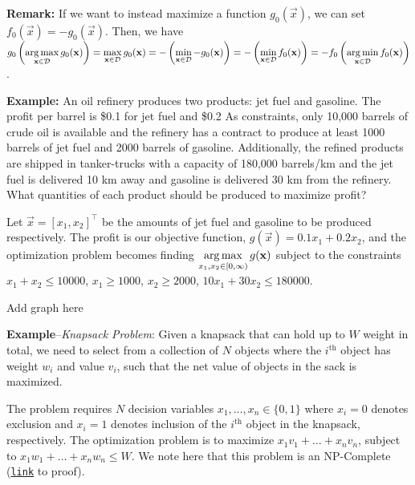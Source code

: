 \documentclass[10pt]{article}
\begin{document}
\textbf{Remark:} If we want to instead maximize a function $g_0(\vec{x})$, we can set $f_0(\vec{x}) = -g_0(\vec{x})$. Then, we have $\displaystyle{g_0\left( \operatorname*{arg\,max}_{\mathbf{x}\in\mathcal{D}}g_0(\mathbf{x})\right)} = \displaystyle{\max_{\mathbf{x} \in \mathcal{D}} g_0(\mathbf{x})}  = \displaystyle{-\left(\min_{\mathbf{x} \in \mathcal{D}} -g_0(\mathbf{x})\right)} = \displaystyle{-\left(\min_{\mathbf{x} \in \mathcal{D}} f_0(\mathbf{x})\right) = -f_0\left( \operatorname*{arg\,min}_{\mathbf{x}\in\mathcal{D}}f_0(\mathbf{x})\right)}$.

\textbf{Example:} An oil refinery produces two products: jet fuel and gasoline. The profit per barrel is \$0.1 for jet fuel and \$0.2 As constraints, only 10,000 barrels of crude oil is available and the refinery has a contract to produce at least 1000 barrels of jet fuel and 2000 barrels of gasoline. Additionally, the refined products are shipped in tanker-trucks with a capacity of 180,000 barrels/km and the jet fuel is delivered 10 km away and gasoline is delivered 30 km from the refinery. What quantities of each product should be produced to maximize profit?

Let $\vec{x} = [x_1, x_2]^\top$ be the amounts of jet fuel and gasoline to be produced respectively. The profit is our objective function, $g(\vec{x}) = 0.1x_1 + 0.2x_2$, and the optimization problem becomes finding $\displaystyle{\operatorname*{arg\,max}_{x_1, x_2 \in [0, \infty)} g(\mathbf{x})}$ subject to the constraints $x_1 + x_2 \leq 10000$, $x_1 \geq 1000$, $x_2 \geq 2000$, $10x_1 + 30x_2 \leq 180000$.

\begin{mdframed}[backgroundcolor=red]
    Add graph here
\end{mdframed}

\textbf{Example}--\textit{Knapsack Problem}: Given a knapsack that can hold up to $W$ weight in total, we need to select from a collection of $N$ objects where the $i^{\text{th}}$ object has weight $w_i$ and value $v_i$, such that the net value of objects in the sack is maximized.

The problem requires $N$ decision variables $x_1, \ldots, x_n \in \{0,1\}$ where $x_i = 0$ denotes exclusion and $x_i = 1$ denotes inclusion of the $i^{\text{th}}$ object in the knapsack, respectively. The optimization problem is to maximize $x_1v_1 + \ldots + x_nv_n$, subject to $x_1w_1 + \ldots + x_nw_n \leq W$. We note here that this problem is an NP-Complete (\href{https://www.cc.gatech.edu/~rpeng/CS3510_F16/notes/Nov28knapsackNPC.pdf}{\texttt{link}} to proof).
\end{document}
